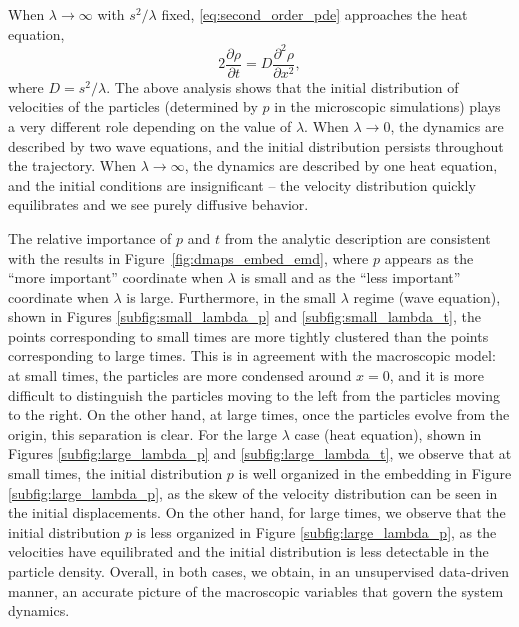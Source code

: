 \documentclass[preprint]{elsarticle}
\begin{document}
When $\lambda \rightarrow \infty$ with $s^2/\lambda$ fixed, \eqref{eq:second_order_pde} approaches the heat equation,
\begin{equation}
2 \frac{\partial \rho}{\partial t} = D \frac{\partial ^2 \rho}{\partial x^2},
\end{equation}
%
where $D=s^2/\lambda$.
%
%
The above analysis shows that the initial distribution of velocities of the particles (determined by $p$ in the microscopic simulations) plays a very different role depending on the value of $\lambda$.
%
When $\lambda \rightarrow 0$, the dynamics are described by two wave equations, and the initial distribution persists throughout the trajectory.
%
When $\lambda \rightarrow \infty$, the dynamics are described by one heat equation, and the initial conditions are insignificant -- the velocity distribution quickly equilibrates and we see purely diffusive behavior.
%

The relative importance of $p$ and $t$ from the analytic description are consistent with the results in Figure~\ref{fig:dmaps_embed_emd}, where $p$ appears as the ``more important'' coordinate when $\lambda$ is small and as the ``less important'' coordinate when $\lambda$ is large. 
%
Furthermore, in the small $\lambda$ regime (wave equation), shown in Figures \ref{subfig:small_lambda_p} and \ref{subfig:small_lambda_t}, the points corresponding to small times are more tightly clustered than the points corresponding to large times.
%
This is in agreement with the macroscopic model: at small times, the particles are more condensed around $x=0$, and it is more difficult to distinguish the particles moving to the left from the particles moving to the right. 
%
On the other hand, at large times, once the particles evolve from the origin, this separation is clear.  
%
For the large $\lambda$ case (heat equation), shown in Figures \ref{subfig:large_lambda_p} and \ref{subfig:large_lambda_t}, we observe that at small times, the initial distribution $p$ is well organized in the embedding in Figure \ref{subfig:large_lambda_p}, as the skew of the velocity distribution can be seen in the initial displacements.
%
On the other hand, for large times, we observe that the initial distribution $p$ is less organized in Figure \ref{subfig:large_lambda_p}, as the velocities have equilibrated and the initial distribution is less detectable in the particle density.
%
Overall, in both cases, we obtain, in an unsupervised data-driven manner, an accurate picture of the macroscopic variables that govern the system dynamics.
\end{document}

